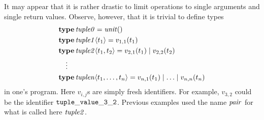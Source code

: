 \documentclass[a4paper,12pt,oneside,fleqn]{book} %
\begin{document}
{\begin{remark}
It may appear that it is rather drastic to limit operations to single
arguments and single return values. Observe, however, that it is trivial to
define types
\begin{align}
&{\bf type}\,{\it tuple0} = {\it unit}() \\
&{\bf type}\,{\it tuple1}\langle t_1\rangle = v_{1,1}(t_1) \\
&{\bf type}\,{\it tuple2}\langle t_1,t_2\rangle = v_{2,1}(t_1) \mid v_{2,2}(t_2) \\
&\quad\vdots\notag \\
&{\bf type}\,{\it tuplen}\langle t_1,\ldots,t_n\rangle
  = v_{n,1}(t_1) \mid \ldots \mid v_{n,n}(t_n)
\end{align}
in one's program. Here $v_{i,j}$s are simply fresh identifiers. For
example, $v_{3,2}$ could be the identifier ${\tt tuple\_value\_3\_2}$.
Previous examples used the name $\it pair$ for what is called here $\it
tuple2$.
\end{remark}

}
\end{document}
